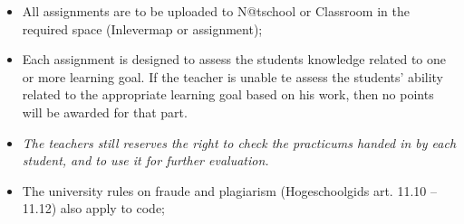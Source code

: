 \begin{itemize}
  \item All assignments are to be uploaded to N@tschool or Classroom in the required space (Inlevermap or assignment);
  \item Each assignment is designed to assess the students knowledge related to one or more learning goal.
          If the teacher is unable te assess the students' ability related to the appropriate learning goal based on his work, then no points will be awarded for that part.
  \item \textit{The teachers still reserves the right to check the practicums handed in by each student, and to use it for further evaluation.}
  \item The university rules on fraude and plagiarism (Hogeschoolgids art. 11.10 -- 11.12) also apply to code;
\end{itemize}

